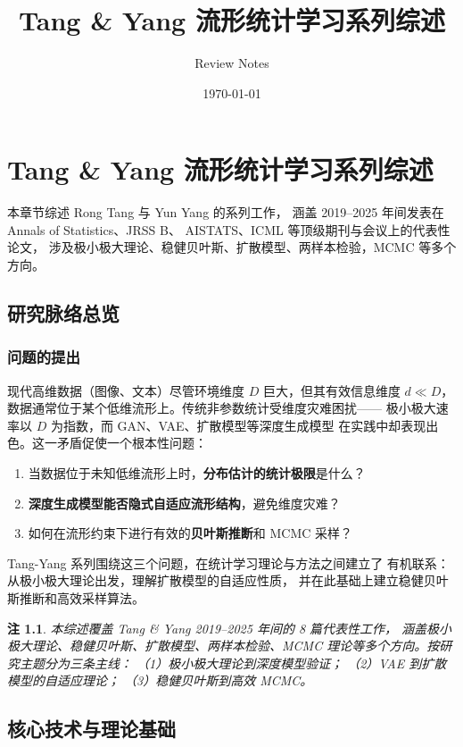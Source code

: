 \documentclass[12pt]{amsbook}
\title{Tang \& Yang 流形统计学习系列综述}
\author{Review Notes}
\date{\today}
\theoremstyle{plain}
\newtheorem*{Remark}{注}
\newcommand{\noteinfo}[1]{%
  \begin{Remark}
    \textit{#1}
  \end{Remark}
}
\begin{document}
\maketitle

\chapter{Tang \& Yang 流形统计学习系列综述}\label{ch:tang-rong-review}

本章节综述 Rong Tang 与 Yun Yang 的系列工作，
涵盖 2019--2025 年间发表在 Annals of Statistics、JRSS B、
AISTATS、ICML 等顶级期刊与会议上的代表性论文，
涉及极小极大理论、稳健贝叶斯、扩散模型、两样本检验，MCMC 等多个方向。

\section{研究脉络总览}\label{sec:tang-overview}

\subsection{问题的提出}\label{sec:tang-problem}

现代高维数据（图像、文本）尽管环境维度 $D$ 巨大，但其有效信息维度
$d \ll D$，数据通常位于某个低维流形上。传统非参数统计受维度灾难困扰——
极小极大速率以 $D$ 为指数，而 GAN、VAE、扩散模型等深度生成模型
在实践中却表现出色。这一矛盾促使一个根本性问题：

\begin{enumerate}
    \item 当数据位于未知低维流形上时，\textbf{分布估计的统计极限}是什么？
    \item \textbf{深度生成模型能否隐式自适应流形结构}，避免维度灾难？
    \item 如何在流形约束下进行有效的\textbf{贝叶斯推断}和 MCMC 采样？
\end{enumerate}

Tang-Yang 系列围绕这三个问题，在统计学习理论与方法之间建立了
有机联系：从极小极大理论出发，理解扩散模型的自适应性质，
并在此基础上建立稳健贝叶斯推断和高效采样算法。

\noteinfo{
本综述覆盖 Tang \& Yang 2019--2025 年间的 8 篇代表性工作，
涵盖极小极大理论、稳健贝叶斯、扩散模型、两样本检验、MCMC
理论等多个方向。按研究主题分为三条主线：
（1）极小极大理论到深度模型验证；
（2）VAE 到扩散模型的自适应理论；
（3）稳健贝叶斯到高效 MCMC。}

\section{核心技术与理论基础}\label{sec:tang-techniques}
\end{document}
